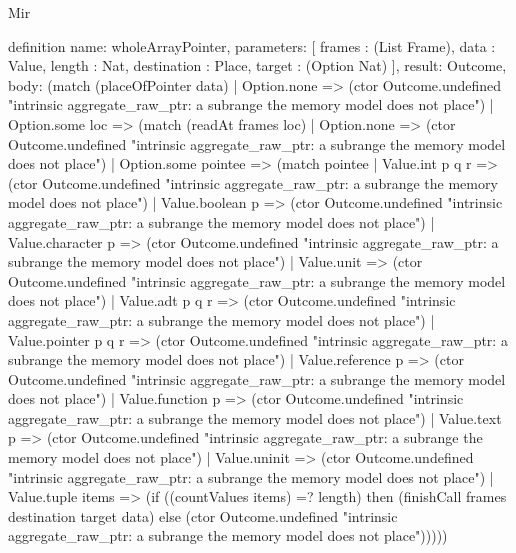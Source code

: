 \begin{lexlean}{Mir}
\begin{semanticmodule}
definition{
  name: wholeArrayPointer,
  parameters: [
    frames : (List Frame),
    data : Value,
    length : Nat,
    destination : Place,
    target : (Option Nat)
  ],
  result: Outcome,
  body: (match (placeOfPointer data)
    | Option.none => (ctor Outcome.undefined "intrinsic aggregate_raw_ptr: a subrange the memory model does not place")
    | Option.some loc => (match (readAt frames loc)
      | Option.none => (ctor Outcome.undefined "intrinsic aggregate_raw_ptr: a subrange the memory model does not place")
      | Option.some pointee => (match pointee
        | Value.int p q r => (ctor Outcome.undefined "intrinsic aggregate_raw_ptr: a subrange the memory model does not place")
        | Value.boolean p => (ctor Outcome.undefined "intrinsic aggregate_raw_ptr: a subrange the memory model does not place")
        | Value.character p => (ctor Outcome.undefined "intrinsic aggregate_raw_ptr: a subrange the memory model does not place")
        | Value.unit => (ctor Outcome.undefined "intrinsic aggregate_raw_ptr: a subrange the memory model does not place")
        | Value.adt p q r => (ctor Outcome.undefined "intrinsic aggregate_raw_ptr: a subrange the memory model does not place")
        | Value.pointer p q r => (ctor Outcome.undefined "intrinsic aggregate_raw_ptr: a subrange the memory model does not place")
        | Value.reference p => (ctor Outcome.undefined "intrinsic aggregate_raw_ptr: a subrange the memory model does not place")
        | Value.function p => (ctor Outcome.undefined "intrinsic aggregate_raw_ptr: a subrange the memory model does not place")
        | Value.text p => (ctor Outcome.undefined "intrinsic aggregate_raw_ptr: a subrange the memory model does not place")
        | Value.uninit => (ctor Outcome.undefined "intrinsic aggregate_raw_ptr: a subrange the memory model does not place")
        | Value.tuple items => (if ((countValues items) =? length) then (finishCall frames destination target data) else (ctor Outcome.undefined "intrinsic aggregate_raw_ptr: a subrange the memory model does not place")))))
}


\end{semanticmodule}
\end{lexlean}
